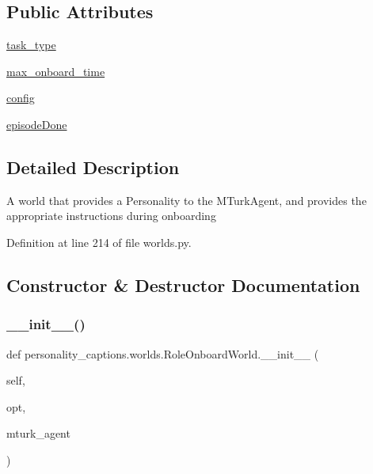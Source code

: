 \subsection*{Public Attributes}
\begin{DoxyCompactItemize}
\item 
\hyperlink{classpersonality__captions_1_1worlds_1_1RoleOnboardWorld_a6cf6206af24cf6a9402f23f620d4e365}{task\+\_\+type}
\item 
\hyperlink{classpersonality__captions_1_1worlds_1_1RoleOnboardWorld_aa6108733e26c2d1761e8155a65c2df12}{max\+\_\+onboard\+\_\+time}
\item 
\hyperlink{classpersonality__captions_1_1worlds_1_1RoleOnboardWorld_ade4545af6ba49e704c8df5d223c330f0}{config}
\item 
\hyperlink{classpersonality__captions_1_1worlds_1_1RoleOnboardWorld_a6f13341d6fc898dc7701a7e99133b885}{episode\+Done}
\end{DoxyCompactItemize}


\subsection{Detailed Description}
\begin{DoxyVerb}A world that provides a Personality to the MTurkAgent, and provides
   the appropriate instructions during onboarding\end{DoxyVerb}
 

Definition at line 214 of file worlds.\+py.



\subsection{Constructor \& Destructor Documentation}
\mbox{\label{classpersonality__captions_1_1worlds_1_1RoleOnboardWorld_a7c26e32198909d8f4527ac967605adb0}} 
\subsubsection{\texorpdfstring{\+\_\+\+\_\+init\+\_\+\+\_\+()}{\_\_init\_\_()}}
{\footnotesize\ttfamily def personality\+\_\+captions.\+worlds.\+Role\+Onboard\+World.\+\_\+\+\_\+init\+\_\+\+\_\+ (\begin{DoxyParamCaption}\item[{}]{self,  }\item[{}]{opt,  }\item[{}]{mturk\+\_\+agent }\end{DoxyParamCaption})}



